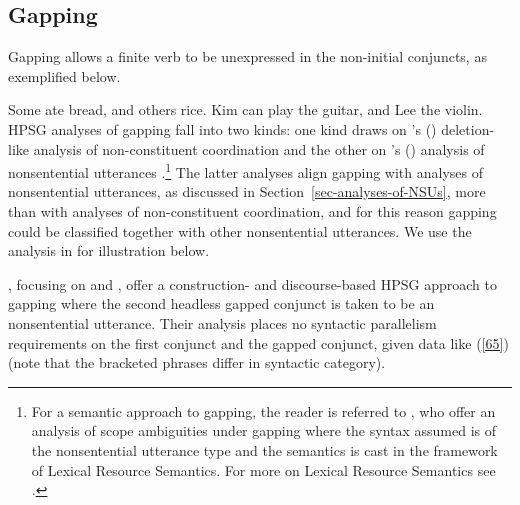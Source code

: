 \subsection{Gapping}
\label{ellipsis:sec-gapping}

Gapping %
allows a finite
verb to be unexpressed in the non-initial conjuncts, as exemplified below. %

\eal
\label{ex-gapping}
\ex Some ate bread, and others rice.\label{g1}
\ex Kim can play the guitar, and Lee the violin.\label{g2}
\zl
%
%
%
%
HPSG analyses of gapping fall into two kinds: one kind draws on \citeauthor{Beavers2004}'s (\citeyear{Beavers2004}) deletion-like analysis of non-constituent coordination \citep{Chaves2009} and the other on \citeauthor{Ginzburg:Sag:2000}'s (\citeyear{Ginzburg:Sag:2000}) analysis of nonsentential utterances \citep{Abeille2014}.\footnote{For a semantic approach to gapping, the reader is referred to \citet{Parketal2019}, who offer an analysis of scope ambiguities under gapping where the syntax assumed is of the nonsentential utterance  type and the semantics is cast in the framework of Lexical Resource Semantics. For more on Lexical Resource Semantics see .} The latter analyses align gapping with analyses of nonsentential utterances, as discussed in Section~\ref{sec-analyses-of-NSUs}, more than with analyses of non-constituent coordination, and for this reason gapping could be classified together with other nonsentential utterances. We use the analysis in \citet{Abeille2014} for illustration below.

\begin{sloppypar}
\citet{Abeille2014}, focusing on  and , offer a construction- and
discourse-based HPSG approach to gapping where the second headless gapped conjunct is taken to be an
nonsentential utterance.  %
Their analysis places no syntactic parallelism requirements on the
first conjunct and the gapped conjunct, given  data like (\ref{65}) (note that the bracketed phrases differ in syntactic category).
\end{sloppypar}

